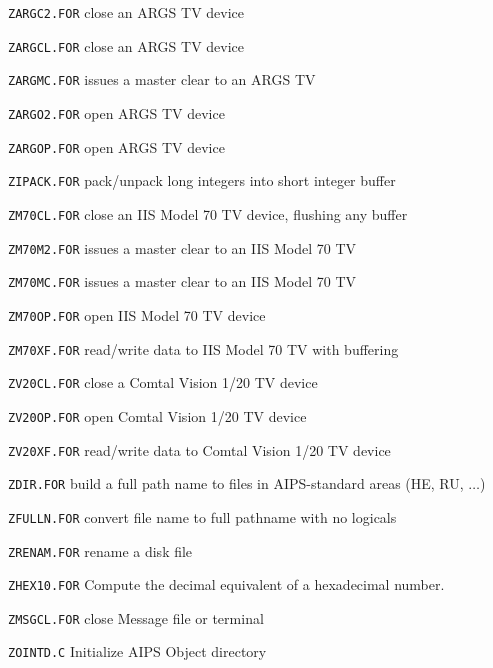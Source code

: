 {\item{\tt ZARGC2.FOR} close an ARGS TV device
\item{\tt ZARGCL.FOR} close an ARGS TV device
\item{\tt ZARGMC.FOR} issues a master clear to an ARGS TV
\item{\tt ZARGO2.FOR} open ARGS TV device
\item{\tt ZARGOP.FOR} open ARGS TV device
\item{\tt ZIPACK.FOR} pack/unpack long integers into short integer buffer
\item{\tt ZM70CL.FOR} close an IIS Model 70 TV device, flushing any buffer
\item{\tt ZM70M2.FOR} issues a master clear to an IIS Model 70 TV
\item{\tt ZM70MC.FOR} issues a master clear to an IIS Model 70 TV
\item{\tt ZM70OP.FOR} open IIS Model 70 TV device
\item{\tt ZM70XF.FOR} read/write data to IIS Model 70 TV with buffering
\item{\tt ZV20CL.FOR} close a Comtal Vision 1/20 TV device
\item{\tt ZV20OP.FOR} open Comtal Vision 1/20 TV device
\item{\tt ZV20XF.FOR} read/write data to Comtal Vision 1/20 TV device

\medskip

\item{\tt ZDIR.FOR} build a full path name to files in AIPS-standard areas (HE, RU, $\dots$)
\item{\tt ZFULLN.FOR} convert file name to full pathname with no logicals
\item{\tt ZRENAM.FOR} rename a disk file

\medskip

\item{\tt ZHEX10.FOR} Compute the decimal equivalent of a hexadecimal number.

\medskip

\item{\tt ZMSGCL.FOR} close Message file or terminal

\medskip

\item{\tt ZOINTD.C} Initialize AIPS Object directory

\medskip

}
